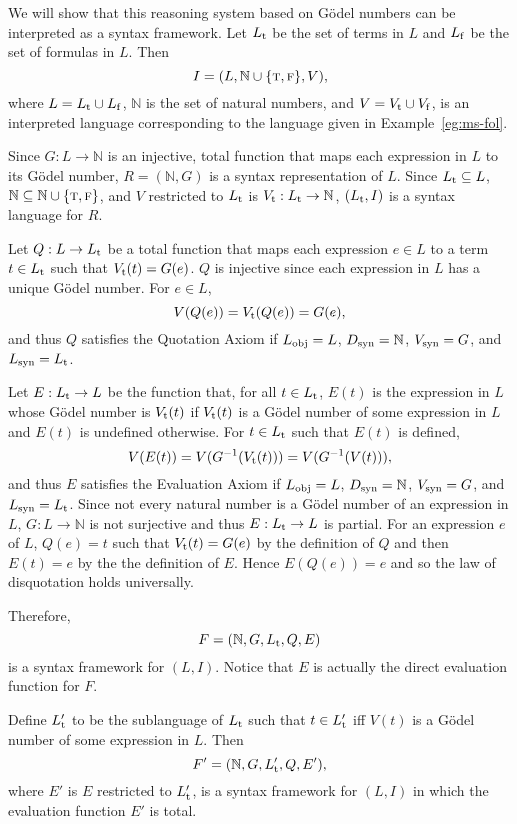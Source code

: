 \documentclass[11pt,fleqn]{article}
\newcommand{\set}[1]{{\{ #1 \}}}
\newcommand{\tarrow}{\rightarrow}
\newcommand{\TRUE}{\mbox{{\sc t}}}
\newcommand{\FALSE}{\mbox{{\sc f}}}
\begin{document}
We will show that this reasoning system based on G\"odel numbers can
be interpreted as a syntax framework.  Let $L_{\rm t}$ be the set of
terms in $L$ and $L_{\rm f}$ be the set of formulas in $L$.  Then \[I=
(L, \mathbb{N} \cup \set{\TRUE,\FALSE}, V),\] where $L = L_{\rm t}
\cup L_{\rm f}$, $\mathbb{N}$ is the set of natural numbers, and $V =
V_{\rm t} \cup V_{\rm f}$, is an interpreted language corresponding to
the language given in Example~\ref{eg:ms-fol}.

Since $G : L \tarrow \mathbb{N}$ is an injective, total function that
maps each expression in $L$ to its G\"odel number, $R =
(\mathbb{N},G)$ is a syntax representation of $L$.  Since $L_{\rm t}
\subseteq L$, $\mathbb{N} \subseteq \mathbb{N} \cup
\set{\TRUE,\FALSE}$, and $V$ restricted to $L_{\rm t}$ is $V_{\rm t} :
L_{\rm t} \tarrow \mathbb{N}$, $(L_{\rm t},I)$ is a syntax language
for $R$.

Let $Q : L \tarrow L_{\rm t}$ be a total function that maps each
expression $e \in L$ to a term $t \in L_{\rm t}$ such that $V_{\rm
  t}(t) = G(e)$.  $Q$ is injective since each expression in $L$ has a
unique G\"odel number.  For $e \in L$, \[V(Q(e)) = V_{\rm t}(Q(e)) =
G(e),\] and thus $Q$ satisfies the Quotation Axiom if $L_{\rm obj} =
L$, $D_{\rm syn} = \mathbb{N}$, $V_{\rm syn} = G$, and $L_{\rm syn} =
L_{\rm t}$.

Let $E : L_{\rm t} \tarrow L$ be the function that, for all $t \in
L_{\rm t}$, $E(t)$ is the expression in $L$ whose G\"odel number is
$V_{\rm t}(t)$ if $V_{\rm t}(t)$ is a G\"odel number of some
expression in $L$ and $E(t)$ is undefined otherwise. For $t \in L_{\rm
  t}$ such that $E(t)$ is defined, \[V(E(t)) = V(G^{-1}(V_{\rm t}(t)))
= V(G^{-1}(V(t))),\] and thus $E$ satisfies the Evaluation Axiom if
$L_{\rm obj} = L$, $D_{\rm syn} = \mathbb{N}$, $V_{\rm syn} = G$, and
$L_{\rm syn} = L_{\rm t}$.  Since not every natural number is a
G\"odel number of an expression in $L$, $G : L \tarrow \mathbb{N}$ is
not surjective and thus $E: L_{\rm t} \tarrow L$ is partial.  For an
expression $e$ of $L$, $Q(e) = t$ such that $V_{\rm t}(t) = G(e)$ by
the definition of $Q$ and then $E(t) = e$ by the the definition of
$E$.  Hence $E(Q(e)) = e$ and so the law of disquotation holds
universally.

Therefore,
\[F = (\mathbb{N},G,L_{\rm t},Q,E)\] 
is a syntax framework for $(L,I)$.  Notice that $E$ is actually the
direct evaluation function for $F$.

Define $L'_{\rm t}$ to be the sublanguage of $L_{\rm t}$ such that $t
\in L'_{\rm t}$ iff $V(t)$ is a G\"odel number of some expression in
$L$.  Then \[F' = (\mathbb{N},G,L'_{\rm t},Q,E'),\] where $E'$ is $E$
restricted to $L'_{\rm t}$, is a syntax framework for $(L,I)$ in which
the evaluation function $E'$ is total.
\end{document}
